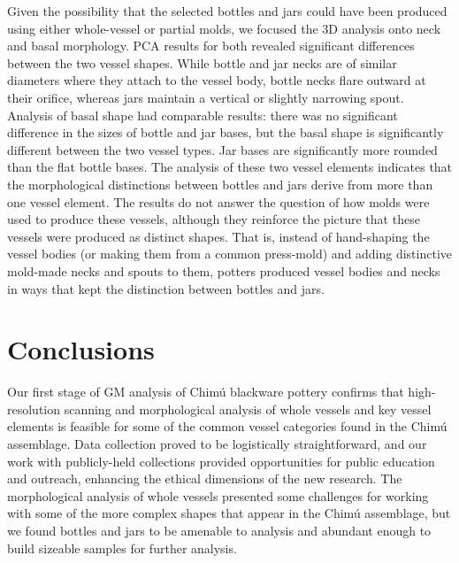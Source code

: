 \documentclass[]{interact}
\theoremstyle{plain}%
\theoremstyle{definition}
\theoremstyle{remark}
\begin{document}
Given the possibility that the selected bottles and jars could have been
produced using either whole-vessel or partial molds, we focused the 3D
analysis onto neck and basal morphology. PCA results for both revealed
significant differences between the two vessel shapes. While bottle and
jar necks are of similar diameters where they attach to the vessel body,
bottle necks flare outward at their orifice, whereas jars maintain a
vertical or slightly narrowing spout. Analysis of basal shape had
comparable results: there was no significant difference in the sizes of
bottle and jar bases, but the basal shape is significantly different
between the two vessel types. Jar bases are significantly more rounded
than the flat bottle bases. The analysis of these two vessel elements
indicates that the morphological distinctions between bottles and jars
derive from more than one vessel element. The results do not answer the
question of how molds were used to produce these vessels, although they
reinforce the picture that these vessels were produced as distinct
shapes. That is, instead of hand-shaping the vessel bodies (or making
them from a common press-mold) and adding distinctive mold-made necks
and spouts to them, potters produced vessel bodies and necks in ways
that kept the distinction between bottles and jars.

\hypertarget{conclusions}{%
\section{Conclusions}\label{conclusions}}

Our first stage of GM analysis of Chimú blackware pottery confirms that
high-resolution scanning and morphological analysis of whole vessels and
key vessel elements is feasible for some of the common vessel categories
found in the Chimú assemblage. Data collection proved to be logistically
straightforward, and our work with publicly-held collections provided
opportunities for public education and outreach, enhancing the ethical
dimensions of the new research. The morphological analysis of whole
vessels presented some challenges for working with some of the more
complex shapes that appear in the Chimú assemblage, but we found bottles
and jars to be amenable to analysis and abundant enough to build
sizeable samples for further analysis.
\end{document}
